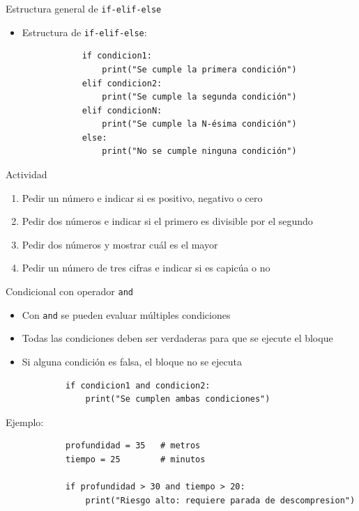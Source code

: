\documentclass{beamer}
\begin{document}
    \begin{frame}[fragile,t]{Estructura general de \texttt{if-elif-else}}
        \begin{itemize}
            \item Estructura de \texttt{if-elif-else}:
            \begin{verbatim}
            if condicion1:
                print("Se cumple la primera condición")
            elif condicion2:
                print("Se cumple la segunda condición")
            elif condicionN:
                print("Se cumple la N-ésima condición")
            else:
                print("No se cumple ninguna condición")
            \end{verbatim}
        \end{itemize}
    \end{frame}

    \begin{frame}{Actividad}
        \begin{enumerate}
            \item Pedir un número e indicar si es positivo, negativo o cero
            \item Pedir dos números e indicar si el primero es divisible por el segundo
            \item Pedir dos números y mostrar cuál es el mayor
            \item Pedir un número de tres cifras e indicar si es capicúa o no
        \end{enumerate}
    \end{frame}

    \begin{frame}[fragile,t]{Condicional con operador \texttt{and}}
        \begin{itemize}
            \item Con \texttt{and} se pueden evaluar múltiples condiciones
            \item Todas las condiciones deben ser verdaderas para que se ejecute el bloque
            \item Si alguna condición es falsa, el bloque no se ejecuta
        \end{itemize}
        \begin{verbatim}
            if condicion1 and condicion2:
                print("Se cumplen ambas condiciones")
        \end{verbatim}
        Ejemplo:
        \begin{verbatim}
            profundidad = 35   # metros
            tiempo = 25        # minutos
            
            if profundidad > 30 and tiempo > 20:
                print("Riesgo alto: requiere parada de descompresion")
        \end{verbatim}
    \end{frame}
\end{document}
